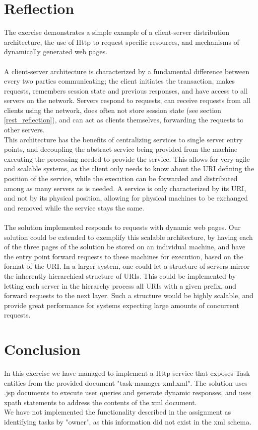 	\section{Reflection}
	\label{servlet_reflection}
		The exercise demonstrates a simple example of a client-server distribution architecture, the use of Http to request specific resources, and mechanisms of dynamically generated web pages.\\\\
		A client-server architecture is characterized by a fundamental difference between every two parties communicating; the client initiates the transaction, makes requests, remembers session state and previous responses, and have access to all servers on the network. Servers respond to requests, can receive requests from all clients using the network, does often not store session state (see section \ref{rest_reflection}), and can act as clients themselves, forwarding the requests to other servers.\\
		This architecture has the benefits of centralizing services to single server entry points, and decoupling the abstract service being provided from the machine executing the processing needed to provide the service. This allows for very agile and scalable systems, as the client only needs to know about the URI defining the position of the service, while the execution can be forwarded and distributed among as many servers as is needed. A service is only characterized by its URI, and not by its physical position, allowing for physical machines to be exchanged and removed while the service stays the same. \\\\
		The solution implemented responds to requests with dynamic web pages. Our solution could be extended to exemplify this scalable architecture, by having each of the three pages of the solution be stored on an individual machine, and have the entry point forward requests to these machines for execution, based on the format of the URI. In a larger system, one could let a structure of servers mirror the inherently hierarchical structure of URIs. This could be implemented by letting each server in the hierarchy process all URIs with a given prefix, and forward requests to the next layer. Such a structure would be highly scalable, and provide great performance for systems expecting large amounts of concurrent requests.
	\section{Conclusion}
	\label{servlet_conclusion}
		In this exercise we have managed to implement a Http-service that exposes Task entities from the provided document "task-manager-xml.xml". The solution uses .jsp documents to execute user queries and generate dynamic responses, and uses xpath statements to address the contents of the xml document. \\
		We have not implemented the functionality described in the assignment as identifying tasks by "owner", as this information did not exist in the xml schema.
